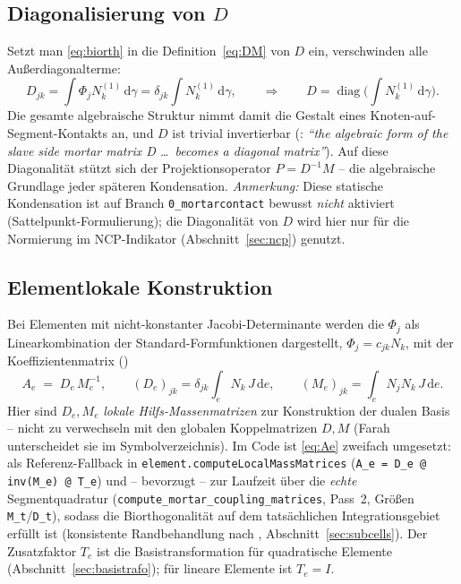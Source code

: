\documentclass[a4paper,11pt]{article}
\def\bm#1{#1}%
\def\tilde#1{#1}%
\newcommand{\code}[1]{\texttt{\small #1}}
\begin{document}
\subsection{Diagonalisierung von $\bm D$}
Setzt man \eqref{eq:biorth} in die Definition~\eqref{eq:DM} von $\bm D$ ein, verschwinden alle
Außerdiagonalterme:
\begin{equation}
D_{jk} = \int \Phi_j N_k^{(1)}\,\mathrm d\gamma = \delta_{jk}\int N_k^{(1)}\,\mathrm d\gamma,
\qquad\Longrightarrow\qquad \bm D = \operatorname{diag}\!\Big(\textstyle\int N_k^{(1)}\,\mathrm d\gamma\Big).
\end{equation}
Die gesamte algebraische Struktur nimmt damit die Gestalt eines Knoten-auf-Segment-Kontakts an, und
$\bm D$ ist trivial invertierbar (\citealp[Abschn.~3.4.1.2, S.~33]{farah}: \emph{``the algebraic form of the slave
side mortar matrix D \ldots\ becomes a diagonal matrix''}). Auf diese Diagonalität stützt sich der
Projektionsoperator $\bm P = \bm D^{-1}\bm M$ \citep[Gl.~(3.65)]{farah} -- die algebraische Grundlage
jeder späteren Kondensation. \emph{Anmerkung:} Diese statische Kondensation ist auf Branch
\code{0\_mortarcontact} bewusst \emph{nicht} aktiviert (Sattelpunkt-Formulierung); die Diagonalität
von $\tilde{\bm D}$ wird hier nur für die Normierung im NCP-Indikator (Abschnitt~\ref{sec:ncp}) genutzt.

\subsection{Elementlokale Konstruktion}
Bei Elementen mit nicht-konstanter Jacobi-Determinante werden die $\Phi_j$ als Linearkombination
der Standard-Formfunktionen dargestellt, $\Phi_j = c_{jk}N_k$, mit der Koeffizientenmatrix
(\citealp[Gl.~(3.53)--(3.56)]{farah})
\begin{equation}
\bm A_e \;=\; \bm D_e\,\bm M_e^{-1},
\qquad
(\bm D_e)_{jk} = \delta_{jk}\!\int_e N_k\,J\,\mathrm de,
\qquad
(\bm M_e)_{jk} = \int_e N_j N_k\,J\,\mathrm de .
\label{eq:Ae}
\end{equation}
Hier sind $\bm D_e,\bm M_e$ \emph{lokale Hilfs-Massenmatrizen} zur Konstruktion der dualen Basis --
nicht zu verwechseln mit den globalen Koppelmatrizen $\bm D,\bm M$ (Farah unterscheidet sie im
Symbolverzeichnis). Im Code ist \eqref{eq:Ae} zweifach umgesetzt: als Referenz-Fallback in
\code{element.computeLocalMassMatrices} (\code{A\_e = D\_e @ inv(M\_e) @ T\_e}) und -- bevorzugt --
zur Laufzeit über die \emph{echte} Segmentquadratur (\code{compute\_mortar\_coupling\_matrices},
Pass~2, Größen \code{M\_t}/\code{D\_t}), sodass die Biorthogonalität
auf dem tatsächlichen Integrationsgebiet erfüllt ist (konsistente Randbehandlung nach
\citet{cichosz}, Abschnitt~\ref{sec:subcells}). Der Zusatzfaktor $\bm T_e$ ist die
Basistransformation für quadratische Elemente (Abschnitt~\ref{sec:basistrafo}); für lineare Elemente
ist $\bm T_e=\bm I$.
\end{document}
